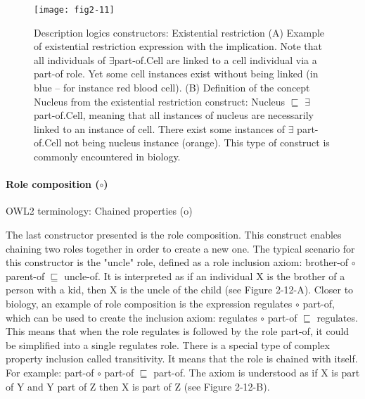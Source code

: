 \begin{figure}[H]
    \centering
    \texttt{[image: fig2-11]}
    \caption{Description logics constructors: Existential restriction (A) Example of existential restriction expression with the implication. Note that all individuals of $ \exists $part-of.Cell are linked to a cell individual via a part-of role. Yet some cell instances exist without being linked (in blue – for instance red blood cell). (B) Definition of the concept Nucleus from the existential restriction construct: Nucleus $ \sqsubseteq $ $ \exists $ part-of.Cell, meaning that all instances of nucleus are necessarily linked to an instance of cell. There exist some instances of $ \exists $ part-of.Cell not being nucleus instance (orange). This type of construct is commonly encountered in biology.}
    \label{fig2-11}
\end{figure}

\paragraph{\textbf{Role composition ($ \circ $)}\\}
OWL2 terminology: Chained properties (o)

The last constructor presented is the role composition. This construct enables chaining two roles together in order to create a new one. The typical scenario for this constructor is the "uncle" role, defined as a role inclusion axiom: brother-of $ \circ $ parent-of $ \sqsubseteq $ uncle-of. It is interpreted as if an individual X is the brother of a person with a kid, then X is the uncle of the child (see Figure 2-12-A). Closer to biology, an example of role composition is the expression regulates $ \circ $ part-of, which can be used to create the inclusion axiom: regulates $ \circ $ part-of $ \sqsubseteq $ regulates. This means that when the role regulates is followed by the role part-of, it could be simplified into a single regulates role. There is a special type of complex property inclusion called transitivity. It means that the role is chained with itself. For example: part-of $ \circ $ part-of $ \sqsubseteq $ part-of. The axiom is understood as if X is part of Y and Y part of Z then X is part of Z (see Figure 2-12-B).

